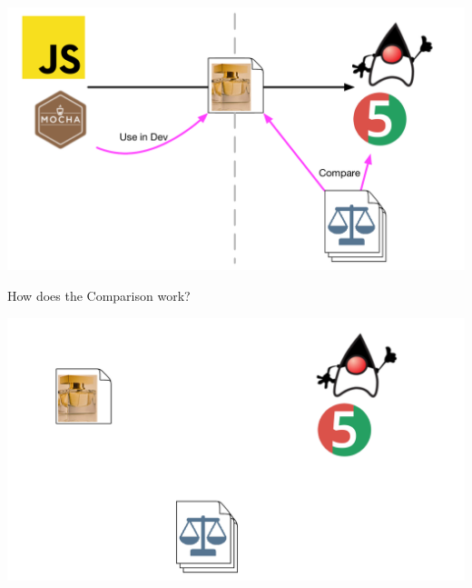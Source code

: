 \begin{frame}[fragile]{}

\includegraphics[width=\textwidth]{images/Essence-4.pdf}

\end{frame}

\begin{frame}[fragile]{}

\begin{center}
{\Huge
How does the Comparison work?
}
\end{center}

\end{frame}

\begin{frame}[fragile]{}

\includegraphics[width=\textwidth]{images/Comparison-1.pdf}

\end{frame}

